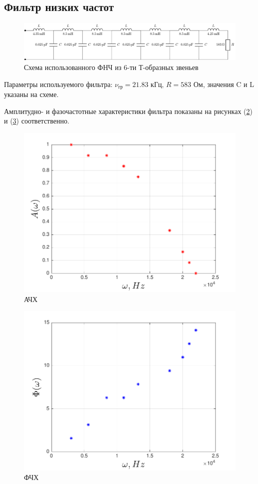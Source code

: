 \subsection{Фильтр низких частот}
\begin{figure}[H]
	\centering
	\includegraphics[scale=0.75]{chem/chem3}
	\caption{ Схема использованного ФНЧ из 6-ти Т-образных звеньев}
	\label{fig:chem3}
\end{figure}
Параметры используемого фильтра:
$\nu_{\text{гр}}=21.83 \text{ кГц} ,\,R=583\text{ Ом}$, значения C и L указаны на схеме.

Амплитудно- и фазочастотные характеристики фильтра показаны на рисунках (\ref{fig:figure1}) и (\ref{fig:figure2}) соответственно.
\begin{figure}[h!]
	\centering
	\includegraphics[]{graph/graph1}
	\caption{АЧХ}
	\label{fig:figure1}
\end{figure}

\begin{figure}[h!]
	\centering
	\includegraphics[]{graph/graph2}
	\caption{ФЧХ}
	\label{fig:figure2}
\end{figure}


